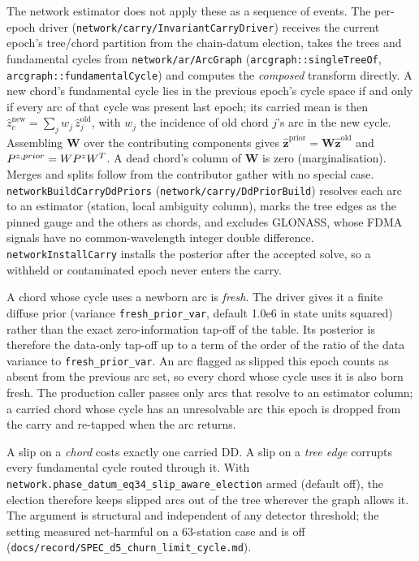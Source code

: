 \documentclass[main.tex]{subfiles}
\begin{document}
The network estimator does not apply these as a sequence of events.
The per-epoch driver (\texttt{network/carry/InvariantCarryDriver}) receives
the current epoch's tree/chord partition from the chain-datum election,
takes the trees and fundamental cycles from \texttt{network/ar/ArcGraph}
(\texttt{arcgraph::singleTreeOf}, \texttt{arcgraph::fundamentalCycle}) and
computes the \emph{composed} transform directly.  A new chord's fundamental cycle
lies in the previous epoch's cycle space if and only if every arc of
that cycle was present last epoch; its carried mean is then
$\hat z^{\text{new}}_c = \sum_j w_j\,\hat z^{\text{old}}_j$, with
$w_j$ the incidence of old chord $j$'s arc in the new cycle.  Assembling
$\bm{W}$ over the contributing components gives
$\hat{\bm{z}}^{\text{prior}} = \bm{W}\hat{\bm{z}}^{\text{old}}$ and
$P^{z,prior} = WP^{z}W^{T}$.  A dead chord's column of $\bm{W}$
is zero (marginalisation).  Merges and splits follow from the
contributor gather with no special case.
\texttt{networkBuildCarryDdPriors} (\texttt{network/carry/DdPriorBuild})
resolves each arc to an estimator (station, local ambiguity column), marks
the tree edges as the pinned gauge and the others as chords, and excludes
GLONASS, whose FDMA signals have no common-wavelength integer double
difference.  \texttt{networkInstallCarry} installs the posterior after the
accepted solve, so a withheld or contaminated epoch never enters the
carry.

A chord whose cycle uses a newborn arc is \emph{fresh}.  The driver
gives it a finite diffuse prior (variance \texttt{fresh\_prior\_var},
default 1.0e6 in state units squared) rather than the exact
zero-information tap-off of the table.  Its posterior is therefore the
data-only tap-off up to a term of the order of the ratio of the data
variance to \texttt{fresh\_prior\_var}.  An arc
flagged as slipped this epoch counts as absent from the previous arc set,
so every chord whose cycle uses it is also born fresh.  The production
caller passes only arcs
that resolve to an estimator column; a carried chord whose cycle has an
unresolvable arc this epoch is dropped from the carry and re-tapped when
the arc returns.

\begin{remark}
A slip on a \emph{chord} costs exactly one carried DD.  A slip on a
\emph{tree edge} corrupts every fundamental cycle routed through it.
With \texttt{network.phase\_datum\_eq34\_slip\_aware\_election} armed
(default off), the election therefore keeps slipped arcs out of the
tree wherever the graph allows it.  The argument is structural and
independent of any detector threshold; the setting measured
net-harmful on a 63-station case and is off
(\texttt{docs/record/SPEC\_d5\_churn\_limit\_cycle.md}).
\end{remark}
\end{document}
